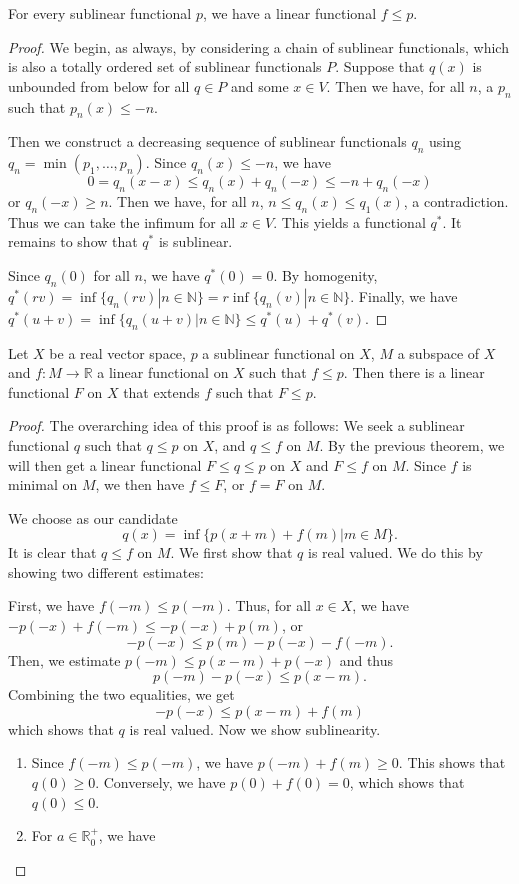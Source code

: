 \documentclass[prb,12pt]{revtex4-2}
\theoremstyle{definition}
\theoremstyle{definition}
\theoremstyle{definition}
\newcommand{\N}{\mathbb{N}}
\newcommand{\R}{\mathbb{R}}
\begin{document}
\begin{Theorem}
	For every sublinear functional $p$, we have a linear functional $f\le p$. 
\end{Theorem}
\begin{proof}
	We begin, as always, by considering a chain of sublinear functionals, which is also a totally ordered set of sublinear functionals $P$. Suppose that $q(x)$ is unbounded from below for all $q\in P$ and some $x\in V$. Then we have, for all $n$, a $p_n$ such that $p_n(x)\le -n$.

	Then we construct a decreasing sequence of sublinear functionals $q_n$ using $q_n=\min (p_1, \dots, p_n)$. Since $q_n(x)\le -n$, we have
	\[
	0=q_n(x-x)\le q_n(x)+q_n(-x)\le -n +q_n(-x)
	\]
	or $q_n(-x)\ge n$. Then we have, for all $n$, $n\le q_n(x)\le q_1(x)$, a contradiction. Thus we can take the infimum for all $x\in V$. This yields a functional $q^*$. It remains to show that $q^*$ is sublinear.

	Since $q_n(0)$ for all $n$, we have $q^*(0)=0$. By homogenity, $q^*(rv)=\inf \{q_n(r v)|n \in \N\}= r \inf \{q_n(v)|n\in \N\} $. Finally, we have $q^*(u+v) = \inf \{q_n(u+v)|n\in \N\}\le q^*(u)+q^*(v)$.
\end{proof}

\begin{Theorem}
	Let $X$ be a real vector space, $p$ a sublinear functional on $X$, $M$ a subspace of $X$ and $f:M \to \R$ a linear functional on $X$ such that $f \le p$. Then there is a linear functional $F$ on $X$ that extends $f$ such that $F \le p$.
\end{Theorem}
\begin{proof}
	The overarching idea of this proof is as follows: We seek a sublinear functional $q$ such that $q\le p$ on $X$, and $q \le f$ on $M$. By the previous theorem, we will then get a linear functional $F \le q \le p$ on $X$ and $F \le f$ on $M$. Since $f$ is minimal on $M$, we then have $f \le F$, or $f=F$ on $M$.

We choose as our candidate
\[
q(x)=\inf \{p(x+m)+f(m)|m \in M \} 
.\] 
It is clear that $q\le f$ on $M$. We first show that $q$ is real valued. We do this by showing two different estimates:

First, we have $f(-m)\le p(-m)$. Thus, for all $x\in X$, we have $-p(-x)+f(-m)\le -p(-x)+p(m)$, or
\[
-p(-x)\le p(m)-p(-x)-f(-m)
.\] 
Then, we estimate $p(-m)\le p(x-m) + p(-x)$ and thus
\[p(-m)-p(-x)\le p(x-m).\]
Combining the two equalities, we get
\[
-p(-x)\le p(x-m)+f(m)
\]
which shows that $q$ is real valued. Now we show sublinearity.
\begin{enumerate}
	\item Since $f(-m) \le p(-m)$, we have $p(-m)+f(m)\ge 0$. This shows that $q(0)\ge 0$. Conversely, we have $p(0)+f(0)=0$, which shows that $q(0)\le 0$. 
	\item For $a\in \R_0^+$, we have
\end{enumerate}
\end{proof}
\end{document}
